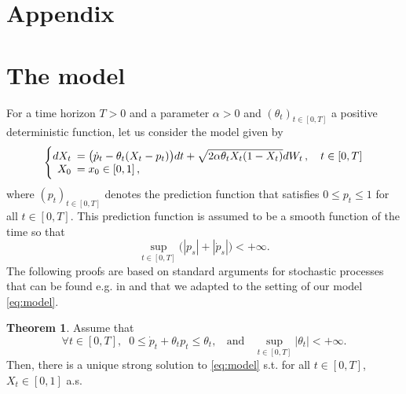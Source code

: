 \documentclass[11pt]{article}
\theoremstyle{definition}
\newtheorem{Thm}[Def]{Theorem}
\begin{document}
\section{Appendix} \label{Appendix}

\section{The model}
For a time horizon $T>0$ and  a parameter $\alpha > 0$ and $(\theta_t)_{t\in[0,T]}$ a positive deterministic  function,  let us consider the model  given by
\begin{equation}
  \left\{
  \begin{array}{@{}rl@{}}
    dX_t \!\!\!&= \big(\dot p_t - \theta_t (X_t-p_t)  \big)dt  +\sqrt{2 \alpha \theta_t X_t (1-X_t)} dW_t\,, \quad t\in[0,T] \\
   X_0  \!\!\!&=  x_0\in [0,1] \,,
 \end{array}\right.  \label{eq:model}
\end{equation}
where $(p_t)_{t\in[0,T]}$ denotes the prediction function that satisfies $0\le p_t\le 1$ for all $t\in[0,T]$. This prediction function is assumed to be a smooth function of the time so that 
$$\sup_{t\in[0,T]}\bigl( |p_s| + |\dot p_s|\big) <+\infty .$$
The following proofs are based on standard arguments for stochastic processes that can be found e.g. in \cite{Alf} and \cite{KarShr} that we adapted to the setting of our model \eqref{eq:model}.
\begin{Thm}\label{thm:exun}
Assume that    
\begin{equation}\label{Assumption:1}
\forall  t\in[0,T],\;\; 0\le \dot p_t +\theta_tp_t\le \theta_t, \;\;\mbox{ and }\;\;
\sup_{t\in[0,T]}|\theta_t|<+\infty\tag{A}. 
\end{equation}
Then, there is a unique strong solution to \eqref{eq:model} s.t.  for all $t\in[0,T]$, $X_t\in[0,1]$ a.s.
\end{Thm}
\end{document}
